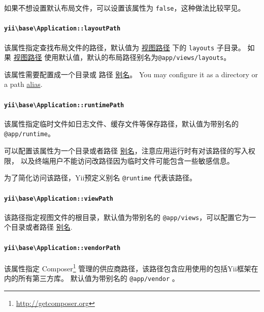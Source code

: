 如果不想设置默认布局文件，可以设置该属性为 \lstinline|false|，这种做法比较罕见。

\paragraph{\texttt{yii{\allowbreak{}\textbackslash}base{\allowbreak{}\textbackslash}Application\allowbreak{}::\allowbreak{}layoutPath} \label{structure-applications.md::layoutPath}}
该属性指定查找布局文件的路径，默认值为 \hyperref[structure-applications.md::::viewPath]{视图路径} 下的 \lstinline|layouts| 子目录。
如果 \hyperref[structure-applications.md::::viewPath]{视图路径} 使用默认值，默认的布局路径别名为\lstinline|@app/views/layouts|。

该属性需要配置成一个目录或 路径 \hyperref[concept-aliases.md]{别名}。
You may configure it as a directory or a path \hyperref[concept-aliases.md]{alias}.

\paragraph{\texttt{yii{\allowbreak{}\textbackslash}base{\allowbreak{}\textbackslash}Application\allowbreak{}::\allowbreak{}runtimePath} \label{structure-applications.md::runtimePath}}
该属性指定临时文件如日志文件、缓存文件等保存路径，默认值为带别名的 \lstinline|@app/runtime|。

可以配置该属性为一个目录或者路径 \hyperref[concept-aliases.md]{别名}，注意应用运行时有对该路径的写入权限，
以及终端用户不能访问改路径因为临时文件可能包含一些敏感信息。

为了简化访问该路径，Yii预定义别名 \lstinline|@runtime| 代表该路径。

\paragraph{\texttt{yii{\allowbreak{}\textbackslash}base{\allowbreak{}\textbackslash}Application\allowbreak{}::\allowbreak{}viewPath} \label{structure-applications.md::viewPath}}
该路径指定视图文件的根目录，默认值为带别名的 \lstinline|@app/views|，可以配置它为一个目录或者路径 \hyperref[concept-aliases.md]{别名}.

\paragraph{\texttt{yii{\allowbreak{}\textbackslash}base{\allowbreak{}\textbackslash}Application\allowbreak{}::\allowbreak{}vendorPath} \label{structure-applications.md::vendorPath}}
该属性指定 Composer\footnote{\url{http://getcomposer.org}} 管理的供应商路径，该路径包含应用使用的包括Yii框架在内的所有第三方库。
默认值为带别名的 \lstinline|@app/vendor| 。

